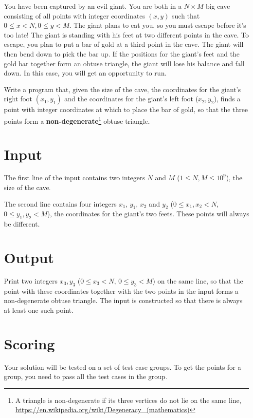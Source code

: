 \def\version{jury-3}
You have been captured by an evil giant.
You are both in a $N \times M$ big cave consisting of all points with integer coordinates $(x, y)$ such that $0 \le x < N, 0 \le y < M$.
The giant plans to eat you, so you must escape before it's too late!
The giant is standing with his feet at two different points in the cave.
To escape, you plan to put a bar of gold at a third point in the cave.
The giant will then bend down to pick the bar up.
If the positions for the giant's feet and the gold bar together form an obtuse triangle, the giant will lose his balance and fall down.
In this case, you will get an opportunity to run.

Write a program that, given the size of the cave, the coordinates for the giant's right foot $(x_1, y_1)$ and the coordinates for the giant's left foot ($x_2, y_2$), finds a point with integer coordinates at which to place the bar of gold, so that the three points form a \textbf{non-degenerate}\footnote{A triangle is non-degenerate if its three vertices do not lie on the same line, \url{https://en.wikipedia.org/wiki/Degeneracy_(mathematics)}} obtuse triangle.

\section*{Input}
The first line of the input contains two integers $N$ and $M$ ($1\leq N, M \leq 10^9$), the size of the cave.

The second line contains four integers $x_1$, $y_1$, $x_2$ and $y_2$ ($0\leq x_1, x_2 < N$, $0\leq y_1, y_2 < M$), the coordinates for the giant's two feets.
These points will always be different.

\section*{Output}
Print two integers $x_3, y_3$ ($0\leq x_3 < N$, $0\leq y_3 < M$) on the same line, so that the point with these coordinates together with the two points in the input forms a non-degenerate obtuse triangle.
The input is constructed so that there is always at least one such point.

\section*{Scoring}
Your solution will be tested on a set of test case groups.
To get the points for a group, you need to pass all the test cases in the group.

